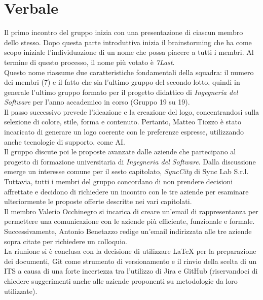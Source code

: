 \documentclass[italian,12pt]{article} %
\begin{document}
\newpage

\section{Verbale}
\begin{flushleft}
Il primo incontro del gruppo inizia con una presentazione di ciascun membro dello stesso.
Dopo questa parte introduttiva inizia il brainstorming che ha come scopo iniziale l’individuazione di un nome che possa piacere a tutti i membri.
Al termine di questo processo, il nome più votato è \textit{7Last}. \\
Questo nome riassume due caratteristiche fondamentali della squadra: il numero dei membri (7) e il fatto che sia l'ultimo gruppo del secondo lotto, quindi in generale l'ultimo gruppo formato per il progetto didattico di \textit{Ingegneria del Software} per l'anno accademico in corso (Gruppo 19 su 19). \\
Il passo successivo prevede l'ideazione e la creazione del logo, concentrandosi sulla selezione di colore, stile, forma e contenuto.
Pertanto, Matteo Tiozzo è stato incaricato di generare un logo coerente con le preferenze espresse, utilizzando anche tecnologie di supporto, come AI. \\
Il gruppo discute poi le proposte avanzate dalle aziende che partecipano al progetto di formazione universitaria di \textit{Ingegneria del Software}. Dalla discussione emerge un interesse comune per il sesto capitolato, \textit{SyncCity} di Sync Lab S.r.l. Tuttavia, tutti i membri del gruppo concordano di non prendere decisioni affrettate e decidono di richiedere un incontro con le tre aziende per esaminare ulteriormente le proposte offerte descritte nei vari capitolati. \\
Il membro Valerio Occhinegro si incarica di creare un'email di rappresentanza per permettere una comunicazione con le aziende più efficiente, funzionale e formale. Successivamente, Antonio Benetazzo redige un'email indirizzata alle tre aziende sopra citate per richiedere un colloquio. \\
La riunione si è conclusa con la decisione di utilizzare LaTeX per la preparazione dei documenti, Git come strumento di versionamento e il rinvio della scelta di un ITS a causa di una forte incertezza tra l'utilizzo di Jira e GitHub (riservandoci di chiedere suggerimenti anche alle aziende proponenti su metodologie da loro utilizzate).

\end{flushleft}
\end{document}
